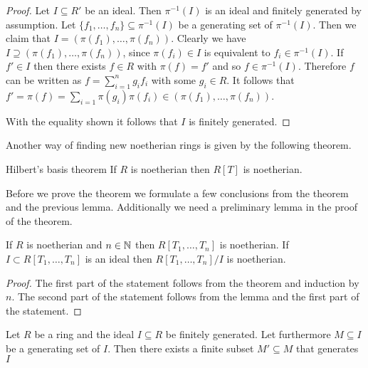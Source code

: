 \documentclass[../notes.tex]{subfiles}
\begin{document}
\begin{proof}
  Let $I \subseteq R'$ be an ideal. Then $\pi^{-1}(I)$ is an ideal
  and finitely generated by assumption. Let $\{f_1, \dots, f_n\} \subseteq \pi^{-1}(I)$
  be a generating set of $\pi^{-1}(I)$. Then we claim that
  $I = (\pi(f_1), \dots, \pi(f_n))$. Clearly we have $I \supseteq (\pi(f_1), \dots, \pi(f_n))$,
  since $\pi(f_i) \in I$ is equivalent to $f_i \in \pi^{-1}(I)$. If $f' \in I$
  then there exists $f \in R$ with $\pi(f) = f'$ and so $f \in \pi^{-1}(I)$.
  Therefore $f$ can be written as $f = \sum_{i = 1}^n g_i f_i$ with some $g_i \in R$.
  It follows that $f' = \pi(f) = \sum_{i = 1} \pi(g_i) \pi(f_i) \in (\pi(f_1), \dots, \pi(f_n))$.

  \smallskip
  \noindent
  With the equality shown it follows that $I$ is finitely generated.
  
\end{proof}

\smallskip
\noindent
Another way of finding new noetherian rings is given by the following theorem.

\smallskip
\begin{theo}{Hilbert's basis theorem}{}
  If $R$ is noetherian then $R[T]$ is noetherian.
\end{theo}

\smallskip
\noindent
Before we prove the theorem we formulate a few conclusions from the theorem and the previous
lemma. Additionally we need a preliminary lemma in the proof of the theorem.

\smallskip
\begin{cor}{}{}
  If $R$ is noetherian and $n \in {\mathbb{N}}$ then $R[T_1, \dots, T_n]$ is noetherian.
  If $I \subset R[T_1, \dots, T_n]$ is an ideal then $R[T_1, \dots, T_n]/I$ is noetherian.
\end{cor}

\begin{proof}
  The first part of the statement follows from the theorem and induction by $n$.
  The second part of the statement follows from the lemma and the first part of the
  statement.
\end{proof}

\begin{lemm}{}{}
  \label{fin_subgen}
  Let $R$ be a ring and the ideal $I \subseteq R$ be finitely generated. Let furthermore
  $M \subseteq I$ be a generating set of $I$. Then there exists a finite subset
  $M' \subseteq M$ that generates $I$
\end{lemm}
\end{document}

